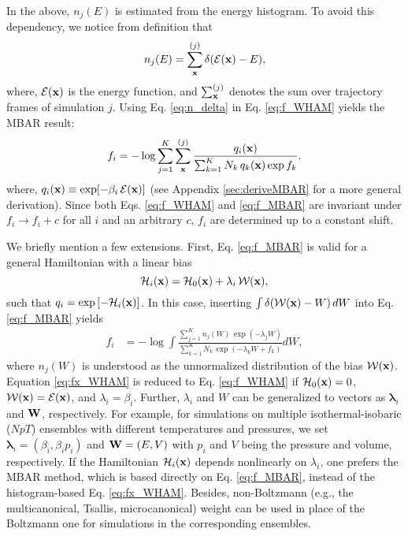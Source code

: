 \documentclass[reprint,aip,jcp,superscriptaddress]{revtex4-1}
\begin{document}
In the above,
$n_j(E)$ is estimated from the energy histogram.
%
To avoid this dependency,
we notice from definition that\cite{
souaille2001}
%
\begin{equation}
n_j(E)
=
\sum_{\mathbf{x}}^{(j)} \delta(\mathcal{E}(\mathbf{x}) - E),
\label{eq:n_delta}
\end{equation}
%
where,
$\mathcal{E}(\mathbf{x})$
is the energy function,
and
$\sum_{\mathbf{x}}^{(j)}$
denotes the sum over trajectory frames
of simulation $j$.
%
%
%
Using Eq. \eqref{eq:n_delta}
in Eq. \eqref{eq:f_WHAM} yields
the MBAR result\cite{
kumar1992, souaille2001, shirts2008}:
%
\begin{equation}
f_i
=
-\log
\sum_{j = 1}^K
\sum_{\mathbf{x}}^{(j)}
\frac{
  q_i(\mathbf{x})
}
{
  \sum_{k = 1}^K N_k \, q_k(\mathbf{x}) \exp f_k
}.
\label{eq:f_MBAR}
\end{equation}
%
where,
$q_i(\mathbf{x}) \equiv \exp[ -\beta_i \, \mathcal{E}(\mathbf{x}) ]$
%
(see Appendix \ref{sec:deriveMBAR}
for a more general derivation).
%
Since both Eqs. \eqref{eq:f_WHAM} and \eqref{eq:f_MBAR}
are invariant under $f_i \rightarrow f_i + c$
for all $i$ and an arbitrary $c$,
$f_i$ are determined up to a constant shift.



We briefly mention a few extensions.
%
First,
Eq. \eqref{eq:f_MBAR}
is valid for a general Hamiltonian
with a linear bias
\[
\mathcal{H}_i(\mathbf{x}) = \mathcal{H}_0(\mathbf{x}) + \lambda_i \, \mathcal{W}(\mathbf{x}),
\]
such that $q_i = \exp\left[ -\mathcal{H}_i(\mathbf{x}) \right]$.
%
In this case,
inserting
$\int \delta(\mathcal{W}(\mathbf{x}) - W) \, dW$
into Eq. \eqref{eq:f_MBAR}
yields
%
\begin{align}
f_i
&=
-\log
  \int
    \frac{
      \sum_{j = 1}^K n_j(W) \, \exp(-\lambda_j W)
    }
    {
      \sum_{k = 1}^K N_k \, \exp(-\lambda_k W + f_k)
    }
    d W,
\label{eq:fx_WHAM}
\end{align}
%
where
$n_j(W)$
is understood as
the unnormalized distribution of
the bias $\mathcal{W}(\mathbf{x})$.
%
Equation \eqref{eq:fx_WHAM}
is reduced to Eq. \eqref{eq:f_WHAM}
if
$\mathcal{H}_0(\mathbf{x}) = 0$,
$\mathcal{W}(\mathbf{x}) = \mathcal{E}(\mathbf{x})$,
and $\lambda_i = \beta_i$.
%
Further,
$\lambda_i$ and $W$
can be generalized
to vectors as
$\bm{\lambda}_i$
and
$\mathbf{W}$, respectively.
%
For example,
for simulations
on multiple isothermal-isobaric ($NpT$) ensembles
with different temperatures and pressures,
%
we set
$\bm{\lambda}_i = (\beta_i, \beta_i p_i)$
and
$\mathbf{W} = (E, V)$
with
$p_i$ and $V$
being the pressure and volume,
respectively.
%
If the Hamiltonian $\mathcal{H}_i(\mathbf{x})$
depends nonlinearly on $\lambda_i$,
one prefers the MBAR method\cite{
shirts2008},
which is based directly on
Eq. \eqref{eq:f_MBAR},
instead of the histogram-based Eq. \eqref{eq:fx_WHAM}.
%
Besides,
non-Boltzmann
(e.g., the multicanonical\cite{
mezei1987, *berg1992, *lee1993},
Tsallis\cite{tsallis1988},
microcanonical\cite{
yan2003, *martin-mayor2007, *zhang2013})
weight
can be used in place of the Boltzmann one
for simulations in the corresponding ensembles.
%
\end{document}
